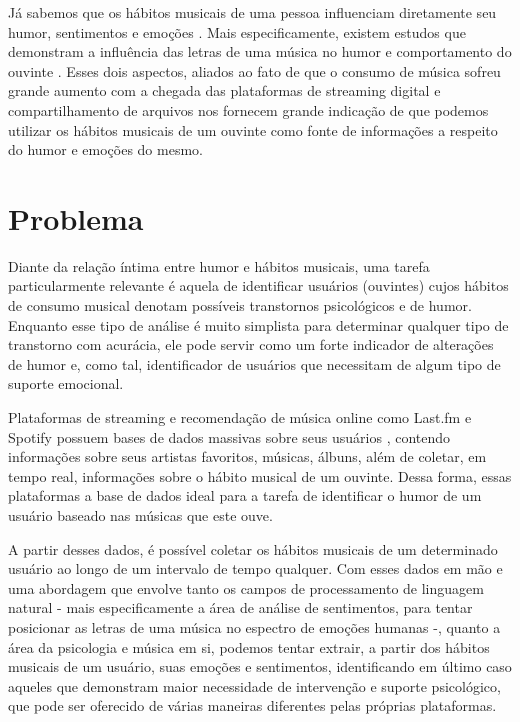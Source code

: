 Já sabemos que os hábitos musicais de uma pessoa influenciam diretamente
seu humor, sentimentos e emoções \cite{mccraty1998}. Mais especificamente, existem estudos que demonstram a influência das letras
de uma música no humor e comportamento do ouvinte
\cite{doi:10.2190/35T0-U4DT-N09Q-LQHW}. Esses dois aspectos, aliados
 ao fato de que o consumo de música sofreu grande aumento com a chegada
 das plataformas de streaming digital e compartilhamento de arquivos
 \cite{doi11044343huang} nos fornecem grande indicação
  de que podemos utilizar os hábitos musicais de um ouvinte como fonte de
 informações a respeito do humor e emoções do mesmo.

\section{Problema}

Diante da relação íntima entre humor e hábitos musicais, uma tarefa
particularmente relevante é aquela de identificar usuários (ouvintes)
cujos hábitos de consumo musical denotam possíveis transtornos
psicológicos e de humor. Enquanto esse tipo de análise é muito simplista
para determinar qualquer tipo de transtorno com acurácia, ele pode servir
como um forte indicador de alterações de humor e, como tal, identificador
de usuários que necessitam de algum tipo de suporte emocional.

Plataformas de streaming e recomendação de música online como Last.fm
\cite{haupt2009} e Spotify \cite{5569963}
possuem bases de dados massivas sobre seus usuários
\cite{pichl2014combining} \cite{4736778}, contendo informações
sobre seus artistas favoritos, músicas, álbuns, além de coletar, em tempo
real, informações sobre o hábito musical de um ouvinte. Dessa forma,
essas plataformas a base de dados ideal para a tarefa de identificar 
o humor de um usuário baseado nas músicas que este ouve.

A partir desses dados, é possível coletar os hábitos musicais de um
determinado usuário ao longo de um intervalo de tempo qualquer. Com
esses dados em mão e uma abordagem que envolve tanto os campos de
processamento de linguagem natural - mais especificamente a área
de análise de sentimentos, para tentar posicionar as letras de uma música 
no espectro de emoções humanas -, quanto a área da psicologia e música
em si, podemos tentar extrair, a partir dos hábitos musicais de um
usuário, suas emoções e sentimentos, identificando em último caso aqueles
que demonstram maior necessidade de intervenção e suporte psicológico, 
que pode ser oferecido de várias maneiras diferentes pelas próprias
plataformas.

